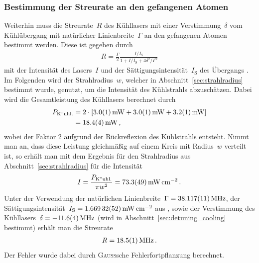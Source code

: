 \documentclass[11pt, a4paper]{article}
\numberwithin{equation}{section}
\begin{document}
\subsubsection{Bestimmung der Streurate an den gefangenen Atomen}
Weiterhin muss die Streurate~$R$ des Kühllasers mit einer Verstimmung~$\delta$ vom Kühlübergang mit natürlicher Linienbreite~$\Gamma$ an den gefangenen Atomen bestimmt werden.
Diese ist gegeben durch
\begin{align*}
	R = \frac{\Gamma}{2} \frac{I / I_\mathrm{S}}{1 + I / I_\mathrm{S} + 4 \delta^2 / \Gamma^2}
\end{align*}
mit der Intensität des Lasers~$I$ und der Sättigungsintensität~$I_\mathrm{S}$ des Übergangs \cite{foot}.
Im Folgenden wird der Strahlradius~$w$, welcher in Abschnitt~\ref{sec:strahlradius} bestimmt wurde, genutzt, um die Intensität des Kühlstrahls abzuschätzen.
Dabei wird die Gesamtleistung des Kühllasers berechnet durch
\begin{align*}
	P_\mathrm{K"uhl.} &= 2 \cdot \left[ \SI{3.0 +- 0.1}{mW} + \SI{3.0 +- 0.1}{mW} + \SI{3.2 +- 0.1}{mW} \right]\\
	  &= \SI{18.4 +- 0.4}{mW} \, \text{,}
\end{align*} 
wobei der Faktor 2 aufgrund der Rückreflexion des Kühlstrahls entsteht.
Nimmt man an, dass diese Leistung gleichmäßig auf einem Kreis mit Radius~$w$ verteilt ist, so erhält man mit dem Ergebnis für den Strahlradius aus Abschnitt~\ref{sec:strahlradius} für die Intensität
\begin{align*}
	I = \frac{P_\mathrm{K"uhl.}}{\pi w^2} = \SI{73.3 +- 4.9}{\milli\watt\per\centi\meter\squared} \, \text{.}
\end{align*}
Unter der Verwendung der natürlichen Linienbreite~$\Gamma = \SI{38.117+-0.011}{MHz}$, der Sättigungsintensität~$I_\mathrm{S} = \SI{1.66932 +- 0.00052}{\milli\watt\per\centi\meter\squared}$ aus \cite{steck}, sowie der Verstimmung des Kühllasers~$\delta = \SI{-11.6+- 0.4}{MHz}$ (wird in Abschnitt~\ref{sec:detuning_cooling} bestimmt) erhält man die Streurate
\begin{align*}
	R = \SI{18.5 +- 0.1}{MHz} \, \text{.}
\end{align*}
Der Fehler wurde dabei durch \textsc{Gauß}sche Fehlerfortpflanzung berechnet.
\end{document}

